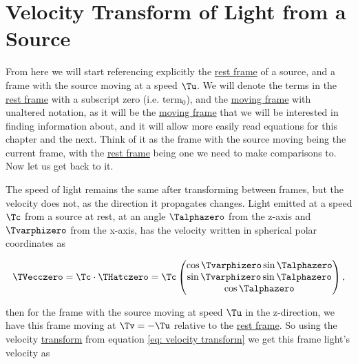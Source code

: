 \section{Velocity Transform of Light from a Source} \label{sect: Light Velocity Transform}

From here we will start referencing explicitly the \hyperlink{def-proper-frame}{rest frame} of a source, and a frame with the source moving at a speed $\Tu $.
We will denote the terms in the \hyperlink{def-proper-frame}{rest frame} with a subscript zero (i.e. $\text{term}_0$), and the \hyperlink{def-Moving-Frame}{moving frame} with unaltered notation, as it will be the \hyperlink{def-Moving-Frame}{moving frame} that we will be interested in finding information about, and it will allow more easily read equations for this chapter and the next.
Think of it as the frame with the source moving being the current frame, with the \hyperlink{def-proper-frame}{rest frame} being one we need to make comparisons to.
Now let us get back to it.

The speed of light remains the same after transforming between frames, but the velocity does not, as the direction it propagates changes.
Light emitted at a speed $\Tc $ from a source at rest, at an angle $\Talphazero $ from the z-axis and $\Tvarphizero $ from the x-axis, has the velocity written in spherical polar coordinates as

\begin{equation}
	\TVecczero   = {\Tc } \cdot {\THatczero  }= {\Tc }
	\begin{pmatrix}
		\cos{\Tvarphizero }\sin{\Talphazero } \\
		\sin{\Tvarphizero }\sin{\Talphazero } \\
		\cos{\Talphazero }                \\
	\end{pmatrix},
\end{equation}

then for the frame with the source moving at speed $\Tu $ in the z-direction, we have this frame moving at $\Tv =-\Tu $ relative to the \hyperlink{def-proper-frame}{rest frame}.
So using the velocity \hyperlink{def-transform}{transform} from equation \eqref{eq: velocity transform} we get this frame light's velocity as


